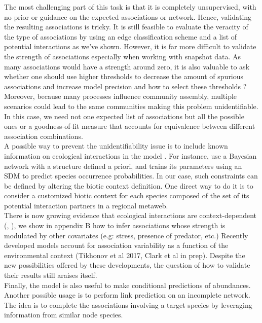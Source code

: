 \documentclass[10pt,a4paper]{article}
\begin{document}
The most challenging part of this task is that it is completely unsupervised, with no prior or guidance on the expected associations or network. Hence, validating the resulting associations is tricky. It is still feasible to evaluate the veracity of the type of associations by using an edge classification scheme and a list of potential interactions as we've shown. However, it is far more difficult to validate the strength of associations especially when working with snapshot data. As many associations would have a strength around zero, it is also valuable to ask whether one should use higher thresholds to decrease the amount of spurious associations and increase model precision and how to select these thresholds ? Moreover, because many processes influence community assembly, multiple scenarios could lead to the same communities making this problem unidentifiable. In this case, we need not one expected list of associations but all the possible ones or a goodness-of-fit measure that accounts for equivalence between different association combinations. \\

A possible way to prevent the unidentifiability issue is to include known information on ecological interactions in the model \cite{cazelles2016theory}. For instance, \cite{staniczenko2017linking} use a Bayesian network with a structure defined a priori, and trains its parameters using an SDM to predict species occurrence probabilities. In our case, such constraints can be defined by altering the biotic context definition. One direct way to do it is to consider a customized biotic context for each species composed of the set of its potential interaction partners in a regional metaweb. \\

There is now growing evidence that ecological interactions are context-dependent (\cite{poisot2015beyond}, \cite{tikhonov2017using}), we show in appendix B how to infer associations whose strength is modulated by other covariates (e.g: stress, presence of predator, etc.) Recently developed models account for association variability as a function of the environmental context (Tikhonov et al 2017, Clark et al in prep). Despite the new possibilities offered by these developments, the question of how to validate their results still araises itself. \\

Finally, the model is also useful to make conditional predictions of abundances. Another possible usage is to perform link prediction on an incomplete network. The idea is to complete the associations involving a target species by leveraging information from similar node species. \\ 
 
\end{document}
